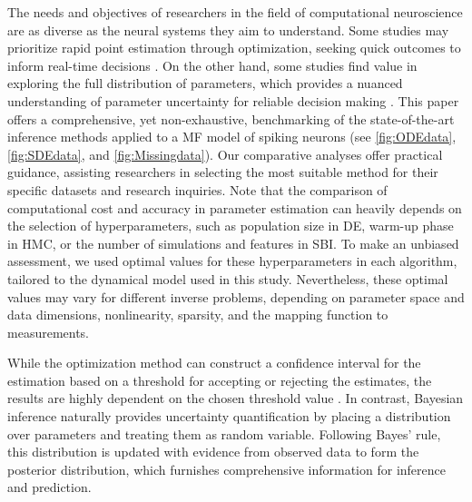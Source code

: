 \documentclass[preprint,11pt,authoryear]{elsarticle}
\begin{document}
The needs and objectives of researchers in the field of computational neuroscience are as diverse as the neural systems they aim to understand. Some studies may prioritize rapid point estimation through optimization, seeking quick outcomes to inform real-time decisions \citep{Vattikonda2021, Penas2023}. On the other hand, some studies find value in exploring the full distribution of parameters, which provides a nuanced understanding of parameter uncertainty for reliable decision making \citep{Hashemi2020, Jha2022}. This paper offers a comprehensive, yet non-exhaustive, benchmarking of the state-of-the-art inference methods applied to a MF model of spiking neurons (see \autoref{fig:ODEdata}, \autoref{fig:SDEdata}, and \autoref{fig:Missingdata}). Our comparative analyses offer practical guidance, assisting researchers in selecting the most suitable method for their specific datasets and research inquiries. Note that the comparison of computational cost and accuracy in parameter estimation can heavily depends on the selection of hyperparameters, such as population size in DE, warm-up phase in HMC, or the number of simulations and features in SBI. To make an unbiased assessment, we used optimal values for these hyperparameters in each algorithm, tailored to the dynamical model used in this study. Nevertheless, these optimal values may vary for different inverse problems, depending on parameter space and data dimensions, nonlinearity, sparsity, and the mapping function to measurements.

While the optimization method can construct a confidence interval for the estimation based on a threshold for accepting or rejecting the estimates, the results are highly dependent on the chosen threshold value \citep{Beaumont2002, Cranmer2020}. In contrast, Bayesian inference naturally provides uncertainty quantification by placing a distribution over parameters and treating them as random variable. Following Bayes' rule, this distribution is updated with evidence from observed data to form the posterior distribution, which furnishes comprehensive information for inference and prediction. 
\end{document}
